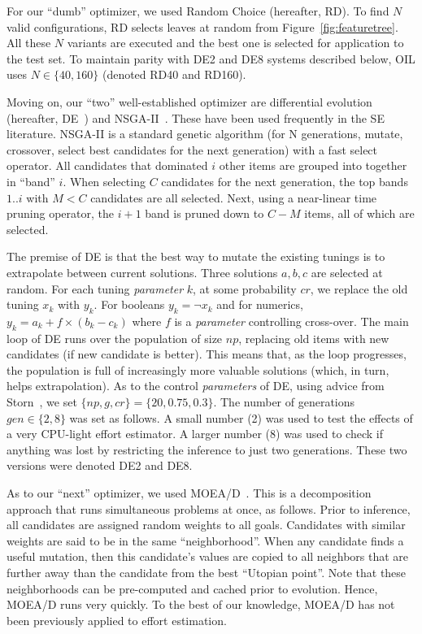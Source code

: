 \documentclass[10pt,conference]{IEEEtran}
\newcommand{\fig}[1]{Figure~\ref{fig:#1}}
\begin{document}
For our ``dumb''  optimizer, we used   Random Choice (hereafter, RD). To find $N$ valid configurations, RD
selects leaves at random from \fig{featuretree}.
All these $N$ variants are executed and the best one is selected for application to the test set. To maintain parity with   DE2 and DE8 systems described below, 
OIL uses  $N\in\{40,160\}$ (denoted RD40 and RD160). 

Moving on, our ``two'' well-established optimizer are differential evolution (hereafter, DE~\cite{storn1997differential}) and NSGA-II~\cite{deb02}. These have been used frequently in the SE literature\cite{Fu2016TuningFS,AGRAWAL2018,agrawal2017better,sayyad2013value,sayyad2013pareto}.
 NSGA-II is a standard genetic algorithm  (for N generations, mutate, crossover, select best candidates  for the next generation) with a fast   select operator. 
All candidates that dominated $i$ other items are grouped into together in ``band'' $i$.
When selecting $C$ candidates for the next generation, the top bands $1..i$ with $M< C$ candidates
are all selected.  Next, using a  near-linear time pruning operator, the $i+1$ band is pruned down to $C-M$ items, all of which are selected.


 The premise of DE is that the best way to mutate the existing tunings is to extrapolate between current solutions. Three solutions $a, b, c$ are selected at random. For each tuning {\em parameter} $k$, at some probability $cr$, we replace the old tuning $x_k$ with $y_k$. For
 booleans $y_k = \neg x_k$ and for numerics, 
\mbox{$y_k = a_k + f \times (b_k - c_k)$}
where $f$ is a
 {\em parameter} controlling cross-over.  
The main loop of DE runs over the population of size $np$, replacing old items with new candidates (if new candidate is better). This means that, as the loop progresses, the population is full of increasingly more valuable solutions (which, in turn,
helps   extrapolation). 
As to the control {\em parameters} of DE,  using advice from Storn~\cite{storn1997differential}, we set $\{\mathit{np,g,cr}\}=\{20,0.75,0.3\}$.
The number of generations $\mathit{gen}\in\{2,8\}$ was set as follows. A   small number (2) was used to test
the effects of  a very   CPU-light    effort estimator. A  larger number (8) was used to check if anything was
lost by restricting the inference to just two generations. These two versions were denoted DE2 and DE8.

As to our ``next'' optimizer, we used MOEA/D~\cite{Zhang07}.
This is a decomposition approach that
runs simultaneous   problems at once, as follows.  Prior to inference,
all candidates are assigned random weights to all  goals. Candidates
with similar weights are said to be in the same ``neighborhood''. When any candidate
 finds a useful mutation, then this candidate's
 values are copied to all neighbors that are further away than the candidate from the  best ``Utopian point''. Note that  these neighborhoods can be pre-computed and cached
prior to evolution. Hence, MOEA/D runs very quickly.
To the best of our knowledge, MOEA/D has not been previously applied to effort estimation.
\end{document}

